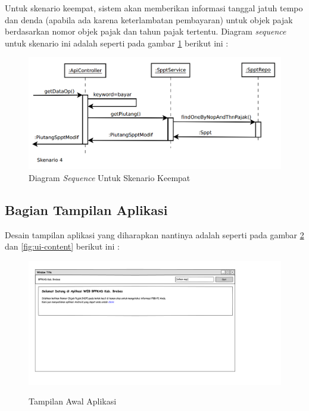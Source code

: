 \documentclass[pdftex,12pt, oneside]{article}
\begin{document}
Untuk skenario keempat, sistem akan memberikan informasi tanggal jatuh tempo dan denda (apabila ada karena keterlambatan pembayaran) untuk objek pajak berdasarkan nomor objek pajak dan tahun pajak tertentu. Diagram \textit{sequence} untuk skenario ini adalah seperti pada gambar \ref{fig:seq-dia-4} berikut ini :

\begin{figure}[H]
	\centering
	\includegraphics[width=1\textwidth]{./resources/seq-dia-4}
	\caption{Diagram \textit{Sequence} Untuk Skenario Keempat}
	\label{fig:seq-dia-4}
\end{figure}

\subsection{Bagian Tampilan Aplikasi}

Desain tampilan aplikasi yang diharapkan nantinya adalah seperti pada gambar \ref{fig:ui-main} dan \ref{fig:ui-content} berikut ini :

\begin{figure}[H]
	\centering
	\includegraphics[width=1\textwidth]{./resources/main_page}
	\label{fig:ui-main}
	\caption{Tampilan Awal Aplikasi}
\end{figure} 
\end{document}
